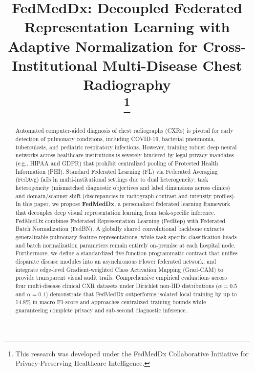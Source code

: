 \documentclass[conference]{IEEEtran}
\begin{document}
\title{FedMedDx: Decoupled Federated Representation Learning with Adaptive Normalization for Cross-Institutional Multi-Disease Chest Radiography\\
\thanks{This research was developed under the FedMedDx Collaborative Initiative for Privacy-Preserving Healthcare Intelligence.}
}

\author{
}

\maketitle

\begin{abstract}
Automated computer-aided diagnosis of chest radiographs (CXRs) is pivotal for early detection of pulmonary conditions, including COVID-19, bacterial pneumonia, tuberculosis, and pediatric respiratory infections. However, training robust deep neural networks across healthcare institutions is severely hindered by legal privacy mandates (e.g., HIPAA and GDPR) that prohibit centralized pooling of Protected Health Information (PHI). Standard Federated Learning (FL) via Federated Averaging (FedAvg) fails in multi-institutional settings due to dual heterogeneity: task heterogeneity (mismatched diagnostic objectives and label dimensions across clinics) and domain/scanner shift (discrepancies in radiograph contrast and intensity profiles). In this paper, we propose \textbf{FedMedDx}, a personalized federated learning framework that decouples deep visual representation learning from task-specific inference. FedMedDx combines Federated Representation Learning (FedRep) with Federated Batch Normalization (FedBN). A globally shared convolutional backbone extracts generalizable pulmonary feature representations, while task-specific classification heads and batch normalization parameters remain entirely on-premise at each hospital node. Furthermore, we define a standardized five-function programmatic contract that unifies disparate disease modules into an asynchronous Flower federated network, and integrate edge-level Gradient-weighted Class Activation Mapping (Grad-CAM) to provide transparent visual audit trails. Comprehensive empirical evaluations across four multi-disease clinical CXR datasets under Dirichlet non-IID distributions ($\alpha = 0.5$ and $\alpha = 0.1$) demonstrate that FedMedDx outperforms isolated local training by up to 14.8\% in macro F1-score and approaches centralized training bounds while guaranteeing complete privacy and sub-second diagnostic inference.
\end{abstract}
\end{document}
